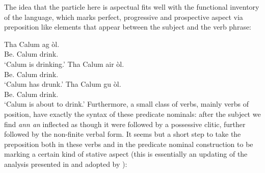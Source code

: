 \documentclass[output=paper]{langsci/langscibook}
\begin{document}


\z
The idea that the particle here is aspectual fits well with the functional
inventory of the language, which marks perfect, progressive and prospective
aspect via preposition like elements that appear between the subject and the
verb phrase:

\ea {}
\sn\gll Tha Calum ag \`ol.\\
Be.\Prs{}  Calum  \Asp{}  drink.\Vn{} \\
\glt \enquote*{Calum is drinking.}
\z
\ea {}
\sn\gll Tha Calum air \`ol.\\
Be.\Prs{}  Calum  \Asp{}  drink.\Vn{} \\
\glt \enquote*{Calum has drunk.}
\z
\ea {}
\sn\gll Tha Calum gu \`ol.\\
Be.\Prs{}  Calum  \Asp{}  drink.\Vn{} \\
\glt \enquote*{Calum is about to drink.}
\z
Furthermore, a small class of verbs, mainly verbs of position, have exactly the
syntax of these predicate nominals: after the subject we find \emph{ann an}
inflected as though it were followed by a possessive clitic, further followed
by the non-finite verbal form. It seems but a short step to take the
preposition both in these verbs and in the predicate nominal construction to be marking a
certain kind of stative aspect (this is essentially an updating of the analysis
presented in \citealt{cram:83} and adopted by \citealt{schreiner:15}):
\end{document}
